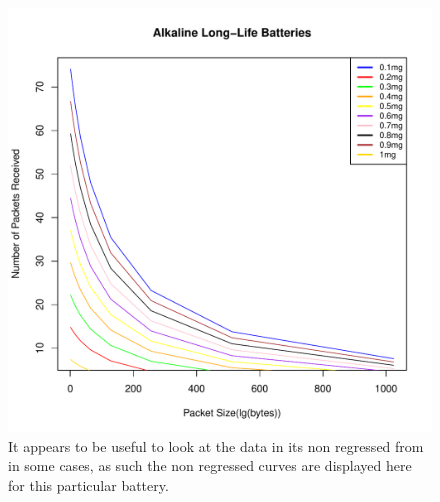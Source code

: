\begin{figure}[h!]
\centering
{}
\includegraphics[width = \linewidth]{Figures/BatteryDeplition/nonlog/ALLiBATnonl.pdf}
\caption{It appears to be useful to look at the data in its non regressed from in some cases, as such the non regressed curves are displayed here for this particular battery.}
\end{figure}

